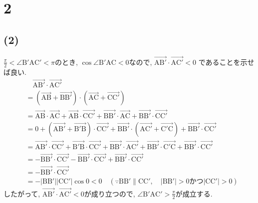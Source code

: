 \documentclass[a4j, 11pt]{jarticle}
\begin{document}
\section*{2}
\subsection*{(2)}
$\frac{\pi}{2} < \angle \mathrm{B'AC'} < \pi$のとき, $\cos \angle \mathrm{B'AC} < 0$なので,
$\overrightarrow{\mathrm{AB'}} \cdot \overrightarrow{\mathrm{AC'}} < 0$
であることを示せば良い.
\begin{align*}
	&\quad \overrightarrow{\mathrm{AB'}} \cdot \overrightarrow{\mathrm{AC'}} \\
	&= (\overrightarrow{\mathrm{AB}} + \overrightarrow{\mathrm{BB'}}) \cdot
	(\overrightarrow{\mathrm{AC}} + \overrightarrow{\mathrm{CC'}}) \\
	&= \overrightarrow{\mathrm{AB}} \cdot \overrightarrow{\mathrm{AC}}
	+ \overrightarrow{\mathrm{AB}} \cdot \overrightarrow{\mathrm{CC'}}
	+ \overrightarrow{\mathrm{BB'}} \cdot \overrightarrow{\mathrm{AC}}
	+ \overrightarrow{\mathrm{BB'}} \cdot \overrightarrow{\mathrm{CC'}} \\
	&= 0 + (\overrightarrow{\mathrm{AB'}} + \overrightarrow{\mathrm{B'B}}) \cdot
	\overrightarrow{\mathrm{CC'}} + \overrightarrow{\mathrm{BB'}} \cdot
	(\overrightarrow{\mathrm{AC'}} + \overrightarrow{\mathrm{C'C}})
	+ \overrightarrow{\mathrm{BB'}} \cdot \overrightarrow{\mathrm{CC'}} \\
	&= \overrightarrow{\mathrm{AB'}} \cdot \overrightarrow{\mathrm{CC'}}
	+ \overrightarrow{\mathrm{B'B}} \cdot \overrightarrow{\mathrm{CC'}}
	+ \overrightarrow{\mathrm{BB'}} \cdot \overrightarrow{\mathrm{AC'}}
	+ \overrightarrow{\mathrm{BB'}} \cdot \overrightarrow{\mathrm{C'C}}
	+ \overrightarrow{\mathrm{BB'}} \cdot \overrightarrow{\mathrm{CC'}} \\
	&= - \overrightarrow{\mathrm{BB'}} \cdot \overrightarrow{\mathrm{CC'}}
	- \overrightarrow{\mathrm{BB'}} \cdot \overrightarrow{\mathrm{CC'}}
	+ \overrightarrow{\mathrm{BB'}} \cdot \overrightarrow{\mathrm{CC'}} \\
	&= - \overrightarrow{\mathrm{BB'}} \cdot \overrightarrow{\mathrm{CC'}} \\
	&= - |\mathrm{BB'}| |\mathrm{CC'}| \cos 0 < 0
	\quad (\because \mathrm{BB'} \parallel \mathrm{CC'}, 
	\quad |\mathrm{BB'}| > 0 \text{かつ} |\mathrm{CC'}| > 0)
\end{align*}
したがって, 
$\overrightarrow{\mathrm{AB'}} \cdot \overrightarrow{\mathrm{AC'}} < 0$が成り立つので, 
$\angle \mathrm{B'AC'} > \frac{\pi}{2}$が成立する.
\end{document}
